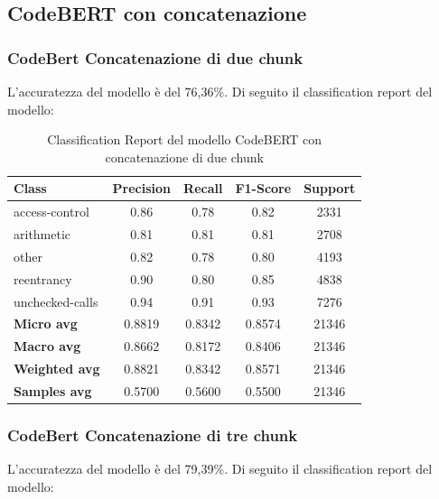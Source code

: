 \documentclass[../../Thesis.tex]{subfiles}
\begin{document}
\subsection{CodeBERT con concatenazione}
\subsubsection{CodeBert Concatenazione di due chunk}
L'accuratezza del modello è del 76,36\%. Di seguito il classification report del modello:

\begin{table}[H]
\centering
\small
\begin{tabular}{lcccc}
\hline
\textbf{Class} & \textbf{Precision} & \textbf{Recall} & \textbf{F1-Score} & \textbf{Support} \\
\hline
access-control & 0.86 & 0.78 & 0.82 & 2331 \\
arithmetic & 0.81 & 0.81 & 0.81 & 2708 \\
other & 0.82 & 0.78 & 0.80 & 4193 \\
reentrancy & 0.90 & 0.80 & 0.85 & 4838 \\
unchecked-calls & 0.94 & 0.91 & 0.93 & 7276 \\
\hline
\textbf{Micro avg} & 0.8819 & 0.8342 & 0.8574 & 21346 \\
\textbf{Macro avg} & 0.8662 & 0.8172 & 0.8406 & 21346 \\
\textbf{Weighted avg} & 0.8821 & 0.8342 & 0.8571 & 21346 \\
\textbf{Samples avg} & 0.5700 & 0.5600 & 0.5500 & 21346 \\
\hline
\end{tabular}
\caption{Classification Report del modello CodeBERT con concatenazione di due chunk}
\end{table}
\subsubsection{CodeBert Concatenazione di tre chunk}
L'accuratezza del modello è del 79,39\%. Di seguito il classification report del modello:
\end{document}
